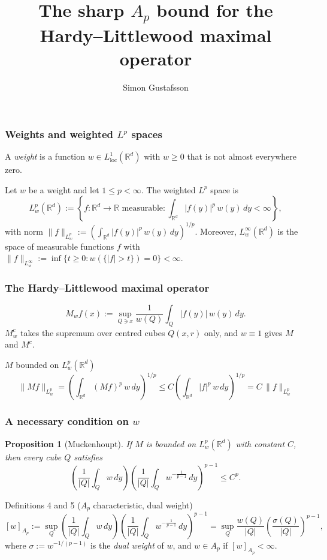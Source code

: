 \documentclass[aspectratio=1610]{beamer}
\title[The sharp $A_p$ bound for $M$]{The sharp $A_p$ bound for the Hardy--Littlewood maximal operator}
\author[Simon Gustafsson]{Simon Gustafsson}
\newtheorem{proposition}{Proposition}
\begin{document}
\begin{frame}[plain]%
  \titlepage
\end{frame}

\begin{frame}
  \frametitle{Weights and weighted $L^p$ spaces}
\begin{definition}[Weights]
A \emph{weight} is a function $w \in L^1_{\mathrm{loc}}(\mathbb{R}^d)$ with $w \ge 0$ that is not almost everywhere zero.
\end{definition}
\pause
\begin{definition}
Let $w$ be a weight and let $1 \le p < \infty$. The weighted $L^p$ space is
\[
  L^p_w(\mathbb{R}^d) := \left\{ f : \mathbb{R}^d \to \mathbb{R} \text{ measurable} : \int_{\mathbb{R}^d} |f(y)|^p\, w(y)\,dy < \infty \right\},
\]
with norm $\|f\|_{L^p_w} := \left( \int_{\mathbb{R}^d} |f(y)|^p\, w(y)\,dy \right)^{1/p}$. Moreover, $L^\infty_w(\mathbb{R}^d)$ is the space of measurable functions $f$ with $\|f\|_{L^\infty_w} := \inf\{ t \ge 0 : w(\{|f| > t\}) = 0 \} < \infty$.
\end{definition}
\end{frame}


\begin{frame}
  \frametitle{The Hardy--Littlewood maximal operator}
\begin{definition}
\[
  M_w f(x) := \sup_{Q \ni x} \frac{1}{w(Q)} \int_Q |f(y)|\, w(y)\,dy .
\]
$M^c_w$ takes the supremum over centred cubes $Q(x,r)$ only, and $w \equiv 1$ gives $M$ and $M^c$.
\end{definition}
\pause
\begin{block}{$M$ bounded on $L^p_w(\mathbb{R}^d)$}
\[
  \|Mf\|_{L^p_w} = \left( \int_{\mathbb{R}^d} (Mf)^p\, w\,dy \right)^{1/p} \le C \left( \int_{\mathbb{R}^d} |f|^p\, w\,dy \right)^{1/p} = C\, \|f\|_{L^p_w}
\]
\end{block}
\end{frame}

\begin{frame}
  \frametitle{A necessary condition on $w$}
\begin{proposition}[Muckenhoupt]
If $M$ is bounded on $L^p_w(\mathbb{R}^d)$ with constant $C$, then every cube $Q$ satisfies
\[
  \left( \frac{1}{|Q|} \int_Q w\,dy \right) \left( \frac{1}{|Q|} \int_Q w^{-\frac{1}{p-1}}\,dy \right)^{p-1} \le C^p .
\]
\end{proposition}
\pause
\vspace{-0.5em}
\begin{block}{Definitions 4 and 5 ($A_p$ characteristic, dual weight)}
\vspace{-1.2em}
\[
  [w]_{A_p} := \sup_{Q} \left( \frac{1}{|Q|} \int_Q w\,dy \right) \left( \frac{1}{|Q|} \int_Q w^{-\frac{1}{p-1}}\,dy \right)^{p-1}
  = \sup_Q \frac{w(Q)}{|Q|} \left( \frac{\sigma(Q)}{|Q|} \right)^{p-1},
\]
where $\sigma := w^{-1/(p-1)}$ is the \emph{dual weight} of $w$, and $w \in A_p$ if $[w]_{A_p} < \infty$.
\end{block}
\end{frame}
\end{document}
